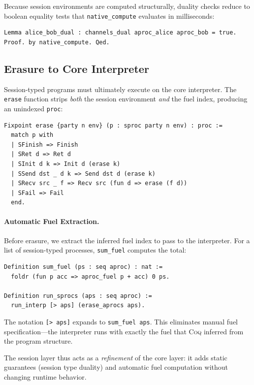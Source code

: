 \documentclass[11pt]{article}
\newcommand{\coqin}[1]{\texttt{#1}}
\newcommand{\coq}{\textsc{Coq}}
\begin{document}
Because session environments are computed structurally, duality checks
reduce to boolean equality tests that \coqin{native\_compute} evaluates
in milliseconds:

\begin{verbatim}
Lemma alice_bob_dual : channels_dual aproc_alice aproc_bob = true.
Proof. by native_compute. Qed.
\end{verbatim}

\subsection{Erasure to Core Interpreter}

Session-typed programs must ultimately execute on the core interpreter.
The \coqin{erase} function strips \emph{both} the session environment
\emph{and} the fuel index, producing an unindexed \coqin{proc}:

\begin{verbatim}
Fixpoint erase {party n env} (p : sproc party n env) : proc :=
  match p with
  | SFinish => Finish
  | SRet d => Ret d
  | SInit d k => Init d (erase k)
  | SSend dst _ d k => Send dst d (erase k)
  | SRecv src _ f => Recv src (fun d => erase (f d))
  | SFail => Fail
  end.
\end{verbatim}

\paragraph{Automatic Fuel Extraction.}
Before erasure, we extract the inferred fuel index to pass to the interpreter.
For a list of session-typed processes, \coqin{sum\_fuel} computes the total:

\begin{verbatim}
Definition sum_fuel (ps : seq aproc) : nat :=
  foldr (fun p acc => aproc_fuel p + acc) 0 ps.

Definition run_sprocs (aps : seq aproc) :=
  run_interp [> aps] (erase_aprocs aps).
\end{verbatim}

The notation \coqin{[> aps]} expands to \coqin{sum\_fuel aps}. This eliminates
manual fuel specification---the interpreter runs with exactly the fuel that
\coq{} inferred from the program structure.

The session layer thus acts as a \emph{refinement} of the core layer: it adds
static guarantees (session type duality) and automatic fuel computation
without changing runtime behavior.
\end{document}
